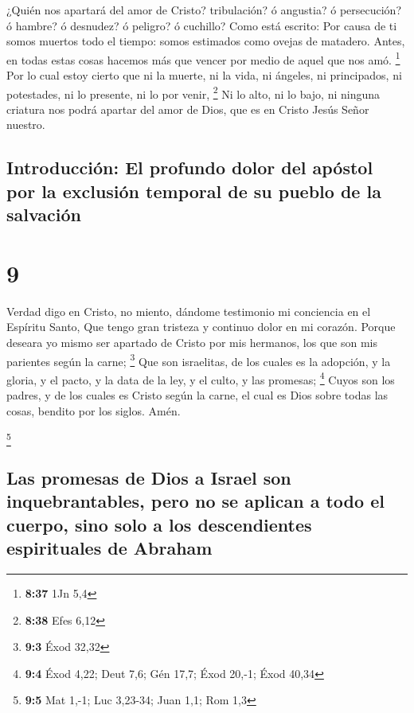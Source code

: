  ¿Quién nos apartará del amor de Cristo? tribulación? ó
angustia? ó persecución? ó hambre? ó desnudez? ó peligro? ó cuchillo?
 Como está escrito: Por causa de ti somos muertos todo el
tiempo: somos estimados como ovejas de matadero.  Antes, en
todas estas cosas hacemos más que vencer por medio de aquel que nos amó.
\footnote{\textbf{8:37} 1Jn 5,4}  Por lo cual estoy cierto
que ni la muerte, ni la vida, ni ángeles, ni principados, ni potestades,
ni lo presente, ni lo por venir, \footnote{\textbf{8:38} Efes 6,12}
 Ni lo alto, ni lo bajo, ni ninguna criatura nos podrá
apartar del amor de Dios, que es en Cristo Jesús Señor nuestro.

\hypertarget{introducciuxf3n-el-profundo-dolor-del-apuxf3stol-por-la-exclusiuxf3n-temporal-de-su-pueblo-de-la-salvaciuxf3n}{%
\subsection{Introducción: El profundo dolor del apóstol por la exclusión
temporal de su pueblo de la
salvación}\label{introducciuxf3n-el-profundo-dolor-del-apuxf3stol-por-la-exclusiuxf3n-temporal-de-su-pueblo-de-la-salvaciuxf3n}}

\hypertarget{section-8}{%
\section{9}\label{section-8}}

 Verdad digo en Cristo, no miento, dándome testimonio mi
conciencia en el Espíritu Santo,  Que tengo gran tristeza y
continuo dolor en mi corazón.  Porque deseara yo mismo ser
apartado de Cristo por mis hermanos, los que son mis parientes según la
carne; \footnote{\textbf{9:3} Éxod 32,32}  Que son
israelitas, de los cuales es la adopción, y la gloria, y el pacto, y la
data de la ley, y el culto, y las promesas; \footnote{\textbf{9:4} Éxod
  4,22; Deut 7,6; Gén 17,7; Éxod 20,-1; Éxod 40,34}  Cuyos
son los padres, y de los cuales es Cristo según la carne, el cual es
Dios sobre todas las cosas, bendito por los siglos. Amén.

\footnote{\textbf{9:5} Mat 1,-1; Luc 3,23-34; Juan 1,1; Rom 1,3}

\hypertarget{las-promesas-de-dios-a-israel-son-inquebrantables-pero-no-se-aplican-a-todo-el-cuerpo-sino-solo-a-los-descendientes-espirituales-de-abraham}{%
\subsection{Las promesas de Dios a Israel son inquebrantables, pero no
se aplican a todo el cuerpo, sino solo a los descendientes espirituales
de
Abraham}\label{las-promesas-de-dios-a-israel-son-inquebrantables-pero-no-se-aplican-a-todo-el-cuerpo-sino-solo-a-los-descendientes-espirituales-de-abraham}}

